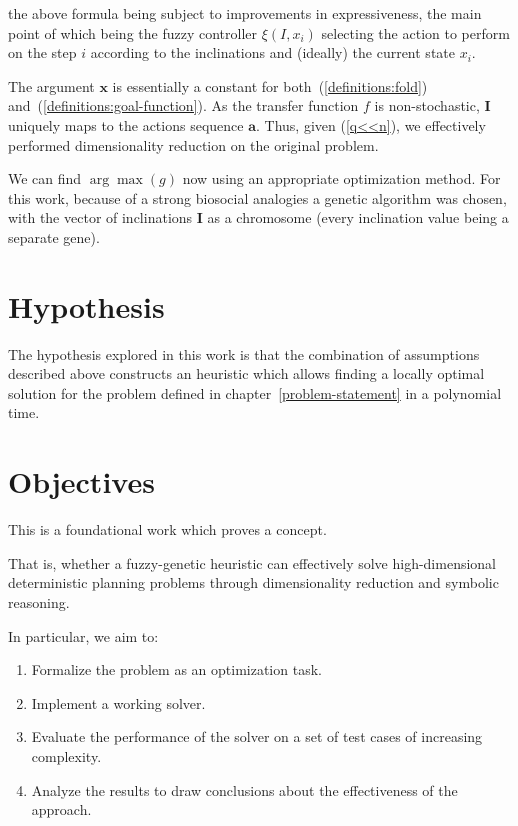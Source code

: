 \documentclass[12pt, a4paper]{report}
\begin{document}
	the above formula being subject to improvements in expressiveness,
	the main point of which being the fuzzy controller $\xi(I, x_i)$ selecting the action to perform on the step $i$ according to the inclinations and (ideally) the current state $x_i$.
	
	The argument $\mathbf{x}$ is essentially a constant for both~(\ref{definitions:fold}) and~(\ref{definitions:goal-function}).
	As the transfer function $f$ is non-stochastic, $\mathbf{I}$ uniquely maps to the actions sequence $\mathbf{a}$.
	Thus, given (\ref{q<<n}), we effectively performed dimensionality reduction on the original problem.
		
	We can find $\arg \max(g)$ now using an appropriate optimization method.
	For this work, because of a strong biosocial analogies a genetic algorithm\cite{mitchell1999geneticalgorithms} was chosen,
	with the vector of inclinations $\mathbf{I}$ as a chromosome (every inclination value being a separate gene).
	
	\section{Hypothesis}
	The hypothesis explored in this work is that the combination of assumptions described above constructs an heuristic which allows finding a locally optimal solution for the problem defined in chapter~\ref{problem-statement} in a polynomial time.
	
	\section{Objectives}\label{section::objectives}
	
	This is a foundational work which proves a concept.
	
	That is, whether a fuzzy-genetic heuristic can effectively solve high-dimensional deterministic planning problems through dimensionality reduction and symbolic reasoning.
	
	In particular, we aim to:
	\begin{enumerate}
		\item\label{goal::formal-problem-statement} Formalize the problem as an optimization task.
		\item\label{goal::working-solver} Implement a working solver.
		\item\label{goal::performance-evaluation} Evaluate the performance of the solver on a set of test cases of increasing complexity.
		\item\label{goal::conclusions} Analyze the results to draw conclusions about the effectiveness of the approach.
	\end{enumerate}
\end{document}
